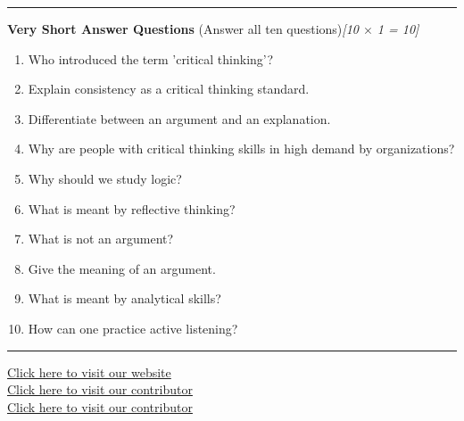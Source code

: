 \documentclass[11pt,a4paper]{article}
\newcommand{\pts}[1]{\hfill\textit{[#1]}}
\begin{document}
\bigskip{}

\rule{\linewidth}{0.4pt}\smallskip

\noindent\textbf{Very Short Answer Questions} (Answer all ten questions)\pts{10 $\times$ 1 = 10}
\begin{enumerate}[label=(\roman*),leftmargin=*,itemsep=6pt]
  \item Who introduced the term 'critical thinking'?
  \item Explain consistency as a critical thinking standard.
  \item Differentiate between an argument and an explanation.
  \item Why are people with critical thinking skills in high demand by organizations?
  \item Why should we study logic?
  \item What is meant by reflective thinking?
  \item What is not an argument?
  \item Give the meaning of an argument.
  \item What is meant by analytical skills?
  \item How can one practice active listening?
\end{enumerate}

\vfill
\rule{\linewidth}{0.4pt}
\begin{center}\small
\href{https://bhu-exam.vercel.app/}{Click here to visit our website}\\[4pt]\href{https://me-aryan.vercel.app/}{Click here to visit our contributor}\\[4pt]\href{https://quashan-me.vercel.app/}{Click here to visit our contributor}
\end{center}
\end{document}
